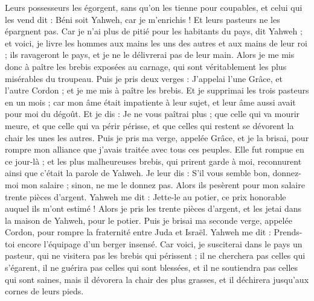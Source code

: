 \begin{multicols}{2}
Leurs possesseurs les égorgent, sans qu'on les tienne pour coupables, et celui qui les vend dit : Béni soit Yahweh, car je m’enrichis !  Et leurs pasteurs ne les épargnent pas.
Car je n’ai plus de pitié pour les habitants du pays, dit Yahweh ; et voici, je livre les hommes aux mains les uns des autres et aux mains de leur roi ; ils ravageront le pays, et je ne le délivrerai pas de leur main.
Alors je me mis donc à paître les brebis exposées au carnage, qui sont véritablement les plus misérables du troupeau. Puis je pris deux verges : J'appelai l'une Grâce, et l'autre Cordon ; et je me mis à paître les brebis.
Et je supprimai les trois pasteurs en un mois ; car mon âme était impatiente à leur sujet, et leur âme aussi avait pour moi du dégoût.
Et je dis : Je ne vous paîtrai plus ; que celle qui va mourir meure, et que celle qui va périr périsse, et que celles qui restent se dévorent la chair les unes les autres.
Puis je pris ma verge, appelée Grâce, et je la brisai, pour rompre mon alliance que j'avais traitée avec tous ces peuples.
Elle fut rompue en ce jour-là ; et les plus malheureuses brebis, qui prirent garde à moi, reconnurent ainsi que c'était la parole de Yahweh.
Je leur dis : S'il vous semble bon, donnez-moi mon salaire ; sinon, ne me le donnez pas.  Alors ils pesèrent  pour mon salaire trente pièces d'argent.
Yahweh me dit : Jette-le au potier, ce prix honorable auquel ils m’ont estimé ! Alors je pris les trente pièces d'argent, et les jetai dans la maison de Yahweh, pour le potier.
Puis je brisai ma seconde verge, appelée Cordon, pour rompre la fraternité entre Juda et Israël.
Yahweh me dit : Prends-toi encore l'équipage d'un berger insensé\FTNT{}.
Car voici, je susciterai dans le pays un pasteur, qui ne visitera pas les brebis qui périssent ; il ne cherchera pas celles qui s’égarent, il ne guérira pas celles qui sont blessées, et il ne soutiendra pas celles qui sont saines, mais il dévorera la chair des plus grasses, et il déchirera jusqu’aux cornes de leurs pieds.

\end{multicols}

